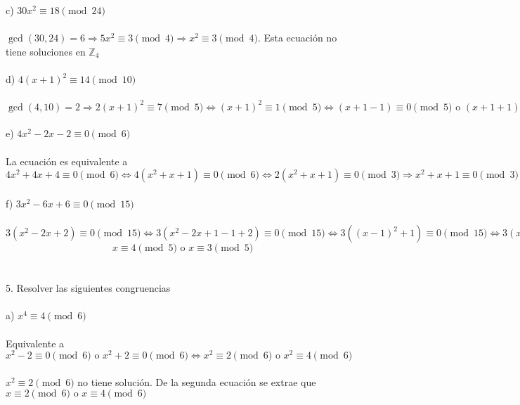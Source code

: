 \documentclass{article}
\begin{document}
\\
\\
c) $30x^{2} \equiv 18 \pmod{24}$
\\
\\
$\gcd{(30,24)}=6 \Longrightarrow 5x^{2} \equiv 3 \pmod{4} \Longrightarrow x^{2} \equiv 3 \pmod{4}$. Esta ecuación no tiene soluciones en $\mathbb{Z}_{4}$
\\
\\
d) $4(x+1)^{2} \equiv 14 \pmod{10}$
\\
\\
$\gcd{(4,10)}=2 \Longrightarrow 2(x+1)^{2} \equiv 7 \pmod{5} \Longleftrightarrow (x+1)^{2} \equiv 1 \pmod{5} \Longleftrightarrow (x+1-1) \equiv 0 \pmod{5} \text{ o } (x+1+1) \equiv 0 \pmod{5} \Longrightarrow x \equiv 0 \pmod{5} \text{ o } x \equiv 3 \pmod{5}$
\\
\\
e) $4x^{2}-2x-2 \equiv 0 \pmod{6}$
\\
\\
La ecuación es equivalente a $4x^{2}+4x+4 \equiv 0 \pmod{6} \Longleftrightarrow 4(x^{2}+x+1) \equiv 0 \pmod{6} \Longleftrightarrow 2(x^{2}+x+1) \equiv 0 \pmod{3} \Longrightarrow x^{2}+x+1 \equiv 0 \pmod{3} \Longrightarrow x \equiv 1 \pmod{3}$
\\
\\
f) $3x^{2}-6x+6 \equiv 0 \pmod{15}$
\\
\\
$3(x^{2}-2x+2) \equiv 0 \pmod{15} \Longleftrightarrow 3(x^{2}-2x+1-1+2) \equiv 0 \pmod{15} \Longleftrightarrow 3\left( (x-1)^{2}+1\right) \equiv 0 \pmod{15} \Longleftrightarrow 3(x-1)^{2} \equiv 12 \pmod{15} \longrightarrow (x-1)^{2} \equiv 4 \pmod{5} \Longleftrightarrow x+1 \equiv 0 \pmod{5} \text{ o } x-3 \equiv 0 \pmod{5}$
\begin{equation*}
    x \equiv 4 \pmod{5} \text{ o } x \equiv 3 \pmod{5}
\end{equation*}
\\
\\
5. Resolver las siguientes congruencias
\\
\\
a) $x^{4} \equiv 4 \pmod{6}$
\\
\\
Equivalente a $x^{2}-2 \equiv 0 \pmod{6} \text{ o } x^{2}+2 \equiv 0 \pmod{6} \Longleftrightarrow x^{2} \equiv 2 \pmod{6} \text{ o } x^{2} \equiv 4 \pmod{6}$
\\
\\
$x^{2} \equiv 2 \pmod{6}$ no tiene solución. De la segunda ecuación se extrae que $x \equiv 2 \pmod{6} \text{ o } x \equiv 4 \pmod{6}$
\end{document}
